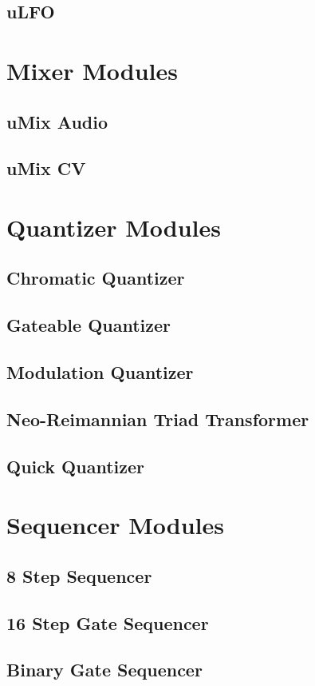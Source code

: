 \documentclass[11pt]{book}
\begin{document}
\section{uLFO}

\chapter{Mixer Modules}
\section{uMix Audio}
\section{uMix CV}

\chapter{Quantizer Modules}
\section{Chromatic Quantizer}
\section{Gateable Quantizer}
\section{Modulation Quantizer}
\section{Neo-Reimannian Triad Transformer}
\section{Quick Quantizer}

\chapter{Sequencer Modules}
\section{8 Step Sequencer}
\section{16 Step Gate Sequencer}
\section{Binary Gate Sequencer}
\end{document}
